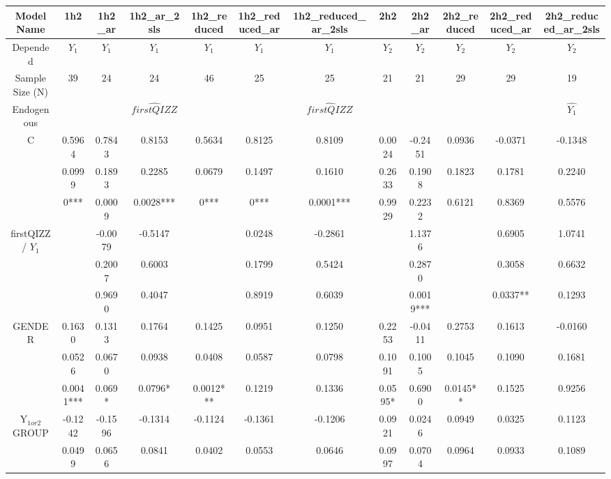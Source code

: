 \documentclass[]{article}
\begin{document}
	\begin{landscape}
		\begin{table}[htp] 
			\centering 
			\begin{adjustbox}{height=0.5\textheight,width=1.6\textwidth}
			\begin{tabular}{c|ccc|ccc|cc|ccc}
				\hline
				Model Name & 1h2 & 1h2\_ar & 1h2\_ar\_2sls & 1h2\_reduced & 1h2\_reduced\_ar & 1h2\_reduced\_ar\_2sls & 2h2 & 2h2\_ar & 2h2\_reduced & 2h2\_reduced\_ar & 2h2\_reduced\_ar\_2sls \\
				\hline
				Depended & $Y_1$ & $Y_1$ & $Y_1$ & $Y_1$ & $Y_1$ & $Y_1$ & $Y_2$ & $Y_2$ & $Y_2$ & $Y_2$ & $Y_2$ \\
				\hline
				Sample Size (N) & 39 & 24 & 24 & 46 & 25 & 25 & 21 & 21 & 29 & 29 & 19 \\
				\hline
				Endogenous &  &  & $\hat{firstQIZZ}$ &  &  & $\hat{firstQIZZ}$ &  &  &  &  & $\hat{Y_1}$ \\
				\hline
				C & 0.5964 & 0.7843 & 0.8153 & 0.5634 & 0.8125 & 0.8109 & 0.0024 & -0.2451 & 0.0936 & -0.0371 & -0.1348 \\
				& 0.0999 & 0.1893 & 0.2285 & 0.0679 & 0.1497 & 0.1610 & 0.2633 & 0.1908 & 0.1823 & 0.1781 & 0.2240 \\
				& 0*** & 0.0009 & 0.0028*** & 0*** & 0*** & 0.0001*** & 0.9929 & 0.2232 & 0.6121 & 0.8369 & 0.5576 \\
				\hline
				firstQIZZ / $Y_1$ &  & -0.0079 & -0.5147 &  & 0.0248 & -0.2861 &  & 1.1376 &  & 0.6905 & 1.0741 \\
				&  & 0.2007 & 0.6003 &  & 0.1799 & 0.5424 &  & 0.2870 &  & 0.3058 & 0.6632 \\
				&  & 0.9690 & 0.4047 &  & 0.8919 & 0.6039 &  & 0.0019*** &  & 0.0337** & 0.1293 \\
				\hline
				GENDER & 0.1630 & 0.1313 & 0.1764 & 0.1425 & 0.0951 & 0.1250 & 0.2253 & -0.0411 & 0.2753 & 0.1613 & -0.0160 \\
				& 0.0526 & 0.0670 & 0.0938 & 0.0408 & 0.0587 & 0.0798 & 0.1091 & 0.1005 & 0.1045 & 0.1090 & 0.1681 \\
				& 0.0041*** & 0.069* & 0.0796* & 0.0012*** & 0.1219 & 0.1336 & 0.0595* & 0.6900 & 0.0145** & 0.1525 & 0.9256 \\
				Y$_{1or2}$GROUP & -0.1242 & -0.1596 & -0.1314 & -0.1124 & -0.1361 & -0.1206 & 0.0921 & 0.0246 & 0.0949 & 0.0325 & 0.1123 \\
				& 0.0499 & 0.0656 & 0.0841 & 0.0402 & 0.0553 & 0.0646 & 0.0997 & 0.0704 & 0.0964 & 0.0933 & 0.1089 \\

\end{tabular}
\end{adjustbox}
\end{table}
\end{landscape}
\end{document}
